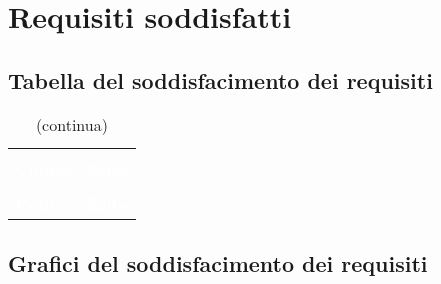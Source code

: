\section{Requisiti soddisfatti}

\subsection{Tabella del soddisfacimento dei requisiti}

\begin{longtable}{c | c}
\rowcolor{white}\caption{Tabella del soddisfacimento dei requisiti}\\
		\rowcolor{redafk}
\textcolor{white}{\textbf{Codice}} & \textcolor{white}{\textbf{Esito}}\\
		\endfirsthead
		\rowcolor{white}\caption[]{(continua)} \\
		\rowcolor{redafk}
\textcolor{white}{\textbf{Codice}} & \textcolor{white}{\textbf{Esito}}\\
		\endhead
		

\end{longtable}

\subsection{Grafici del soddisfacimento dei requisiti}
